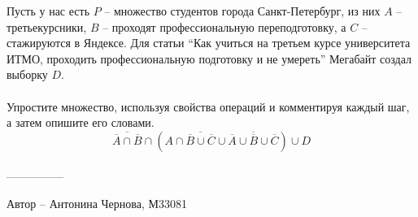 \question
Пусть у нас есть $P$ -- множество студентов города Санкт-Петербург, из них $A$ -- третьекурсники, $B$ -- проходят профессиональную переподготовку, а $C$ -- стажируются в Яндексе. Для статьи “Как учиться на третьем курсе университета ИТМО, проходить профессиональную подготовку и не умереть” Мегабайт создал выборку $D$.
\\
\\
Упростите множество, используя свойства операций и комментируя каждый шаг, а затем опишите его словами.
\begin{equation*}
    \overline{\overline{A} \cap \overline{B}} \cap (A \cap \overline{\overline{B} \cup \overline{C}} \cup \overline{\overline{A} \cup \overline{B} \cup \overline{C}}) \cup D
\end{equation*}
\\
---------------

Автор -- Антонина Чернова, М33081